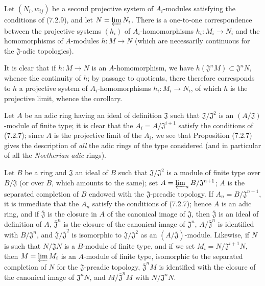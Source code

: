 \begin{corollary}[7.2.10]
\label{0.7.2.10}
Let $(N_i,w_{ij})$ be a second projective system of $A_i$-modules satisfying the
conditions of \textup{(7.2.9)}, and let $N=\varprojlim N_i$. There is a one-to-one
correspondence between the projective systems $(h_i)$ of $A_i$-homomorphisms
$h_i:M_i\to N_i$ and the homomorphisms of $A$-modules $h:M\to N$ (which are
necessarily continuous for the $\mathfrak J$-adic topologies).
\end{corollary}

It is clear that if $h:M\to N$ is an $A$-homomorphism, we have
$h(\mathfrak J^nM)\subset\mathfrak J^nN$, whence the continuity of $h$; by
passage to quotients, there therefore corresponds to $h$ a projective system of
$A_i$-homomorphisms $h_i:M_i\to N_i$, of which $h$ is the projective limit,
whence the corollary.

\begin{remark}[7.2.11]
\label{0.7.2.11}
Let $A$ be an adic ring having an ideal of definition $\mathfrak J$ such that
$\mathfrak J/\mathfrak J^2$ is an $(A/\mathfrak J)$-module of finite type;
it is clear that the $A_i=A/\mathfrak J^{i+1}$ satisfy
the conditions of (7.2.7); since $A$ is the projective limit of the $A_i$, we
see that Proposition (7.2.7) gives the description of \emph{all} the adic
rings of the type considered (and in particular of all the \emph{Noetherian
adic} rings).
\end{remark}

\begin{example}[7.2.12]
\label{0.7.2.12}
Let $B$ be a ring and $\mathfrak J$ an ideal of $B$ such that
$\mathfrak J/\mathfrak J^2$ is a module of finite type over
$B/\mathfrak J$ (or over $B$, which amounts to the same); set
$A=\varprojlim_n B/\mathfrak J^{n+1}$; $A$ is the separated completion of $B$
endowed with the $\mathfrak J$-preadic topology. If
$A_n=B/\mathfrak J^{n+1}$, it is immediate that the $A_n$ satisfy the
conditions of (7.2.7); hence $A$ is an adic ring, and if
$\overline{\mathfrak J}$ is the closure in $A$ of the canonical image of
$\mathfrak J$, then $\overline{\mathfrak J}$ is an ideal of definition of $A$,
$\overline{\mathfrak J}^n$ is the closure of the canonical image of
$\mathfrak J^n$, $A/\overline{\mathfrak J}^n$ is identified with
$B/\mathfrak J^n$, and
$\overline{\mathfrak J}/\overline{\mathfrak J}^2$ is isomorphic to
$\mathfrak J/\mathfrak J^2$ as an
$(A/\overline{\mathfrak J})$-module. Likewise, if $N$ is such that
$N/\mathfrak JN$ is a $B$-module of finite type, and if we set
$M_i=N/\mathfrak J^{i+1}N$, then $M=\varprojlim M_i$ is an $A$-module of finite
type, isomorphic to the separated completion of $N$ for the
$\mathfrak J$-preadic topology, $\overline{\mathfrak J}^nM$ is identified with
the closure of the canonical image of $\mathfrak J^nN$, and
$M/\overline{\mathfrak J}^nM$ with $N/\mathfrak J^nN$.
\end{example}

